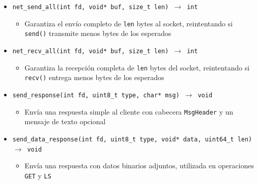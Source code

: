 \documentclass[12pt, letterpaper]{article}
\begin{document}
\begin{itemize}
    \subsection*{Helpers de red}
    \item \texttt{net\_send\_all(int fd, void* buf, size\_t len) $\to$ int}
        \begin{itemize}
            \item Garantiza el envío completo de \texttt{len} bytes al 
                  socket, reintentando si \texttt{send()} transmite menos 
                  bytes de los esperados
        \end{itemize}
    \item \texttt{net\_recv\_all(int fd, void* buf, size\_t len) $\to$ int}
        \begin{itemize}
            \item Garantiza la recepción completa de \texttt{len} bytes 
                  del socket, reintentando si \texttt{recv()} entrega 
                  menos bytes de los esperados
        \end{itemize}
    \item \texttt{send\_response(int fd, uint8\_t type, char* msg) $\to$ void}
        \begin{itemize}
            \item Envía una respuesta simple al cliente con cabecera 
                  \texttt{MsgHeader} y un mensaje de texto opcional
        \end{itemize}
    \item \texttt{send\_data\_response(int fd, uint8\_t type, 
          void* data, uint64\_t len) $\to$ void}
        \begin{itemize}
            \item Envía una respuesta con datos binarios adjuntos, 
                  utilizada en operaciones \texttt{GET} y \texttt{LS}
        \end{itemize}
\end{itemize}
\end{document}

